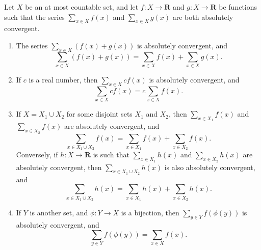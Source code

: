 \begin{additional corollary}\label{ac 8.2.1}
Let \(X\) be an at most countable set, and let \(f : X \to \mathbf{R}\) and \(g : X \to \mathbf{R}\) be functions such that the series \(\sum_{x \in X} f(x)\) and \(\sum_{x \in X} g(x)\) are both absolutely convergent.
\begin{enumerate}
    \item The series \(\sum_{x \in X} (f(x) + g(x))\) is absolutely convergent, and
          \[
              \sum_{x \in X} (f(x) + g(x)) = \sum_{x \in X} f(x) + \sum_{x \in X} g(x).
          \]
    \item If \(c\) is a real number, then \(\sum_{x \in X} cf(x)\) is absolutely convergent, and
          \[
              \sum_{x \in X} cf(x) = c \sum_{x \in X} f(x).
          \]
    \item If \(X = X_1 \cup X_2\) for some disjoint sets \(X_1\) and \(X_2\), then \(\sum_{x \in X_1} f(x)\) and \\
          \(\sum_{x \in X_2} f(x)\) are absolutely convergent, and
          \[
              \sum_{x \in X_1 \cup X_2} f(x) = \sum_{x \in X_1} f(x) + \sum_{x \in X_2} f(x).
          \]
          Conversely, if \(h : X \to \mathbf{R}\) is such that \(\sum_{x \in X_1} h(x)\) and \(\sum_{x \in X_2} h(x)\) are absolutely convergent, then \(\sum_{x \in X_1 \cup X_2} h(x)\) is also absolutely convergent, and
          \[
              \sum_{x \in X_1 \cup X_2} h(x) = \sum_{x \in X_1} h(x) + \sum_{x \in X_2} h(x).
          \]
    \item If \(Y\) is another set, and \(\phi : Y \to X\) is a bijection, then \(\sum_{y \in Y} f(\phi(y))\) is absolutely convergent, and
          \[
              \sum_{y \in Y} f(\phi(y)) = \sum_{x \in X} f(x).
          \]
\end{enumerate}
\end{additional corollary}

